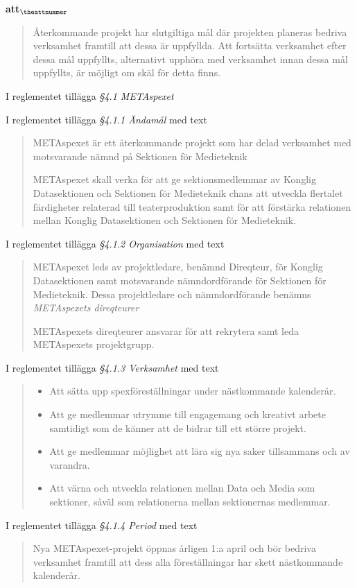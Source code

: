 \documentclass[a4paper]{article}
\begin{document}
\begin{list}{\bf att$_{\theattnummer}$}{}
\begin{quote}
        Återkommande projekt har slutgiltiga mål där projekten planeras bedriva verksamhet framtill
        att dessa är uppfyllda. Att fortsätta verksamhet efter dessa mål uppfyllts,
        alternativt upphöra med verksamhet innan dessa mål uppfyllts, är möjligt om skäl för detta
        finns.
    \end{quote}


\item I reglementet tillägga \textit{\S4.1 METAspexet}
\item I reglementet tillägga \textit{\S4.1.1 Ändamål} med text
    \begin{quote}
        METAspexet är ett återkommande projekt som har delad verksamhet med motsvarande nämnd på Sektionen för Medieteknik

        METAspexet skall verka för att ge sektionsmedlemmar av Konglig Datasektionen och Sektionen för Medieteknik chans att utveckla flertalet färdigheter relaterad till teaterproduktion samt för att förstärka relationen mellan Konglig Datasektionen och Sektionen för Medieteknik.
    \end{quote}
\item I reglementet tillägga \textit{\S4.1.2 Organisation} med text
    \begin{quote}
        METAspexet leds av projektledare, benämnd Direqteur, för Konglig Datasektionen samt motsvarande nämndordförande
        för Sektionen för Medieteknik. Dessa projektledare och nämndordförande benämns \textit{METAspexets direqteurer}

        METAspexets direqteurer ansvarar för att rekrytera samt leda METAspexets projektgrupp.
    \end{quote}
\item I reglementet tillägga \textit{\S4.1.3 Verksamhet} med text
    \begin{quote}
        \begin{itemize}
            \item Att sätta upp spexföreställningar under nästkommande kalenderår.
            \item Att ge medlemmar utrymme till engagemang och kreativt arbete samtidigt som de känner att de bidrar till ett större projekt.
            \item Att ge medlemmar möjlighet att lära sig nya saker tillsammans och av varandra.
            \item Att värna och utveckla relationen mellan Data och Media som sektioner, såväl som relationerna mellan sektionernas medlemmar.
        \end{itemize}
    \end{quote}
\item I reglementet tillägga \textit{\S4.1.4 Period} med text
    \begin{quote}
        Nya METAspexet-projekt öppnas årligen 1:a april och bör bedriva verksamhet framtill att dess alla föreställningar har skett nästkommande kalenderår.


\end{quote}
\end{list}
\end{document}
